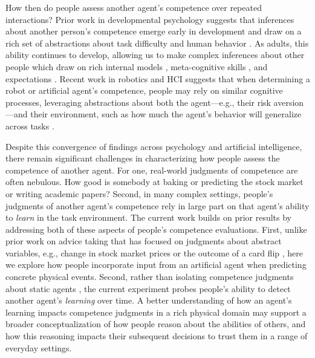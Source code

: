 \documentclass[10pt,letterpaper]{article}
\begin{document}
How then do people assess another agent's competence over repeated interactions? Prior work in developmental psychology suggests that inferences about another person's competence emerge early in development and draw on a rich set of abstractions about task difficulty and human behavior \cite{gweon2021inferential, leonard2019better}. As adults, this ability continues to develop, allowing us to make complex inferences about other people which draw on rich internal models \cite{velez2019integrating, velez2021learning}, meta-cognitive skills \cite{pescetelli2021role}, and expectations \cite{leong2018unrealistic, chang2010seeing}. Recent work in robotics and HCI suggests that when determining a robot or artificial agent's competence, people may rely on similar cognitive processes, leveraging abstractions about both the agent---e.g., their risk aversion \cite{xie2019robot}---and their environment, such as how much the agent's behavior will generalize across tasks \cite{soh2020multi}. 

Despite this convergence of findings across psychology and artificial intelligence, there remain significant challenges in characterizing how people assess the competence of another agent. For one, real-world judgments of competence are often nebulous. How good is somebody at baking or predicting the stock market or writing academic papers? Second, in many complex settings, people's judgments of another agent's competence rely in large part on that agent's ability to \textit{learn} in the task environment. The current work builds on prior results by addressing both of these aspects of people's competence evaluations. First, unlike prior work on advice taking that has focused on judgments about abstract variables, e.g., change in stock market prices \cite{leong2018unrealistic} or the outcome of a card flip \cite{velez2019integrating}, here we explore how people incorporate input from an artificial agent when predicting concrete physical events. Second, rather than isolating competence judgments about static agents \cite{chen2020trust}, the current experiment probes people's ability to detect another agent's \textit{learning} over time. A better understanding of how an agent's learning impacts competence judgments in a rich physical domain may support a broader conceptualization of how people reason about the abilities of others, and how this reasoning impacts their subsequent decisions to trust them in a range of everyday settings.
\end{document}
